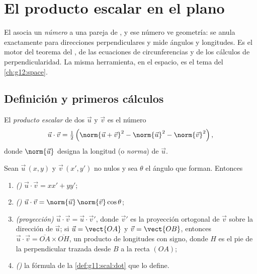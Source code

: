 \chapter{El producto escalar en el plano}\label{ch:g11:scal}

El  asocia un \emph{número} a una pareja de , y ese
número ve geometría: se anula exactamente para direcciones perpendiculares
y mide ángulos y longitudes. Es el motor del teorema del , de las
ecuaciones de circunferencias y de los cálculos de perpendicularidad. La
misma herramienta, en el espacio, es el tema del \cref{ch:g12:space}.

\section{Definición y primeros cálculos}

\begin{definition}\label{def:g11:scal:dot}
El \emph{producto escalar} de dos 
$\vec u$ y $\vec v$ es el número
\[
\vec u \cdot \vec v
= \tfrac12\left(\norm{\vec u + \vec v}^2 - \norm{\vec u}^2
- \norm{\vec v}^2\right),
\]
donde $\norm{\vec u}$ designa la longitud (o \emph{norma}) de
$\vec u$.
\end{definition}

\begin{theorem}\label{thm:g11:scal:faces}
Sean $\vec u\,(x, y)$ y $\vec v\,(x', y')$  no nulos y sea
$\theta$ el ángulo que forman. Entonces
\begin{enumerate}
  \item \emph{()} $\vec u \cdot \vec v = xx' + yy'$;
  \item \emph{()} $\vec u \cdot \vec v =
        \norm{\vec u}\,\norm{\vec v}\cos\theta$;
  \item \emph{(proyección)} $\vec u \cdot \vec v = \vec u \cdot \vec v'$,
        donde $\vec v'$ es la proyección ortogonal de $\vec v$ sobre la
        dirección de $\vec u$; si $\vec u = \vect{OA}$ y
        $\vec v = \vect{OB}$, entonces
        $\vec u \cdot \vec v = \overline{OA} \times \overline{OH}$, un
        producto de longitudes con signo, donde $H$ es el pie de la
        perpendicular trazada desde $B$ a la recta $(OA)$;
  \item \emph{()} la fórmula de la \cref{def:g11:scal:dot} que lo
        define.
\end{enumerate}
\end{theorem}

